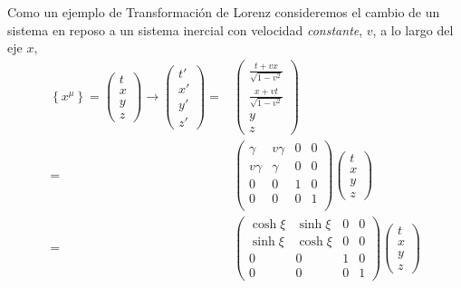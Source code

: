 \begin{frame}


Como un ejemplo de Transformación de Lorenz consideremos el cambio de un sistema en reposo a un sistema inercial con velocidad \emph{constante},  $v$, a lo largo del eje $x$,
\begin{align}
\label{eq:147}
  \left\{x^\mu\right\}=\begin{pmatrix}
    t\\
    x\\
    y\\
    z
  \end{pmatrix}\to
  \begin{pmatrix}
    t'\\
    x'\\
    y'\\
    z'
  \end{pmatrix}=&
  \begin{pmatrix}
  \displaystyle{ \frac{t+vx}{\sqrt{1-v^2}} }\\
  \displaystyle{ \frac{x+vt}{\sqrt{1-v^2}} }\\
    y\\
    z
  \end{pmatrix} \nonumber\\
=&\begin{pmatrix}
  \gamma   & v \gamma & 0 & 0 \\
  v \gamma & \gamma & 0 & 0\\
  0 & 0 & 1 & 0 \\
    0 & 0 & 0 & 1 \\
   \end{pmatrix} 
\begin{pmatrix}
    t\\
    x\\
    y\\
    z
  \end{pmatrix}\nonumber\\
  =&
  \begin{pmatrix}
    \cosh\xi&\sinh\xi&0&0\\
    \sinh\xi&\cosh\xi&0&0\\
    0     &  0  &1&0\\
    0     &  0  &0&1
  \end{pmatrix}
  \begin{pmatrix}
    t\\
    x\\
    y\\
    z
  \end{pmatrix} \nonumber\\

\end{align}
\end{frame}
